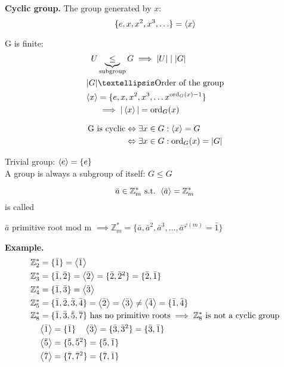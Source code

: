 \textbf{Cyclic group.}
The group generated by $x$:
\[
  \{ e, x, x^2, x^3, \ldots \} = \left\langle x \right\rangle
\]

G is finite:
\begin{align*}
  U & \underbrace{\leq}_{\text{subgroup}}  G \implies |U| \mid |G|\\
  |G| & …\text{Order of the group}\\
      \GroupGenBy{x} &= \{ e, x, x^2, x^3, \ldots x^{\ord_G(x) -1}\} \\
    & \implies |\GroupGenBy{x}| = \ord_G(x)\\
\end{align*}

\begin{align*}
  \text{G is cyclic} & \Leftrightarrow \exists x \in G: \left\langle x \right\rangle = G \\
                     & \Leftrightarrow \exists x \in G: \operatorname{ord}_G(x) = |G|
\end{align*}

Trivial group: $\left\langle e \right\rangle = \{e\}$\\
A group is always a subgroup of itself: $G \leq G$

\begin{definition}
  \[
    \bar{a} \in \mathbb{Z}_m^{*} \text{ s.t. } \left\langle \bar{a} \right\rangle = \mathbb{Z}_m^{*}
\]
is called 

$\bar{a}$ primitive root mod m
$\implies \mathbb{Z}_m^{*} = \{\bar{a}, \bar{a}^2, \bar{a}^3, \ldots, \bar{a}^{\varphi(m)} =\bar{1} \}$
\end{definition}

\textbf{Example.}
\begin{align*}
  &\mathbb{Z}_2^{*} = \{\bar{1}\} = \left\langle \bar{1} \right\rangle \\
  &\mathbb{Z}_3^{*} = \{\bar{1}, \bar{2}\} = \left\langle \bar{2} \right\rangle
    = \{\bar{2}, \bar{2}^2 \} = \{\bar{2}, \bar{1}\}\\
  &\mathbb{Z}_4^{*} = \{\bar{1}, \bar{3}\} = \left\langle \bar{3} \right\rangle \\
  &\mathbb{Z}_5^{*} = \{\bar{1}, \bar{2}, \bar{3}, \bar{4}\}
    = \left\langle \bar{2} \right\rangle = \left\langle \bar{3} \right\rangle \neq \left\langle \bar{4} \right\rangle
    = \{\bar{1}, \bar{4}\} \\
  &\mathbb{Z}_8^{*} = \{\bar{1}, \bar{3}, \bar{5}, \bar{7}\} \text{ has no primitive roots} \implies \mathbb{Z}_8^{*}\text{ is not a cyclic group} \\
  & \quad \left\langle \bar{1} \right\rangle = \{\bar{1}\} \quad \left\langle \bar{3} \right\rangle=\{\bar{3}, \bar{3}^2\}=\{\bar{3}, \bar{1}\} \\
  & \quad \left\langle \bar{5} \right\rangle=\{\bar{5}, \bar{5}^2\}=\{\bar{5}, \bar{1}\} \\
  & \quad \left\langle \bar{7} \right\rangle=\{\bar{7}, \bar{7}^2\}=\{\bar{7}, \bar{1}\}
\end{align*}

